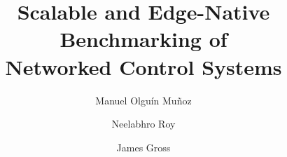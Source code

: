 \documentclass[sigconf,10pt,natbib=false]{acmart}
\title{Scalable and Edge-Native Benchmarking of\\{Networked Control Systems}}
\author{Manuel {Olguín Muñoz}}
\affiliation{%
\institution{KTH Royal Institute of Technology}%
\department[1]{School of Electrical Engineering and Computer Science}%
\city{Stockholm}%
\country{Sweden}%
}
\author{Neelabhro Roy}
\affiliation{%
\institution{KTH Royal Institute of Technology}%
\department[1]{School of Electrical Engineering and Computer Science}%
\city{Stockholm}%
\country{Sweden}%
}
\author{James Gross}
\affiliation{%
\institution{KTH Royal Institute of Technology}%
\department[1]{School of Electrical Engineering and Computer Science}%
\city{Stockholm}%
\country{Sweden}%
}
\begin{document}
\maketitle
\renewcommand{\shortauthors}{{Olguín Muñoz} et al.}






\printbibliography{}
\end{document}
